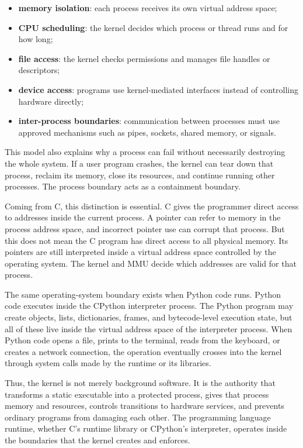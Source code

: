 \documentclass[a4paper,twoside]{report}
\begin{document}
\begin{itemize}
    \item \textbf{memory isolation}: each process receives its own virtual address space;
    \item \textbf{CPU scheduling}: the kernel decides which process or thread runs and for how long;
    \item \textbf{file access}: the kernel checks permissions and manages file handles or descriptors;
    \item \textbf{device access}: programs use kernel-mediated interfaces instead of controlling hardware directly;
    \item \textbf{inter-process boundaries}: communication between processes must use approved mechanisms such as pipes, sockets, shared memory, or signals.
\end{itemize}

This model also explains why a process can fail without necessarily destroying the whole system. If a user program crashes, the kernel can tear down that process, reclaim its memory, close its resources, and continue running other processes. The process boundary acts as a containment boundary.

Coming from C, this distinction is essential. C gives the programmer direct access to addresses inside the current process. A pointer can refer to memory in the process address space, and incorrect pointer use can corrupt that process. But this does not mean the C program has direct access to all physical memory. Its pointers are still interpreted inside a virtual address space controlled by the operating system. The kernel and MMU decide which addresses are valid for that process.

The same operating-system boundary exists when Python code runs. Python code executes inside the CPython interpreter process. The Python program may create objects, lists, dictionaries, frames, and bytecode-level execution state, but all of these live inside the virtual address space of the interpreter process. When Python code opens a file, prints to the terminal, reads from the keyboard, or creates a network connection, the operation eventually crosses into the kernel through system calls made by the runtime or its libraries.

Thus, the kernel is not merely background software. It is the authority that transforms a static executable into a protected process, gives that process memory and resources, controls transitions to hardware services, and prevents ordinary programs from damaging each other. The programming language runtime, whether C's runtime library or CPython's interpreter, operates inside the boundaries that the kernel creates and enforces.
\end{document}

